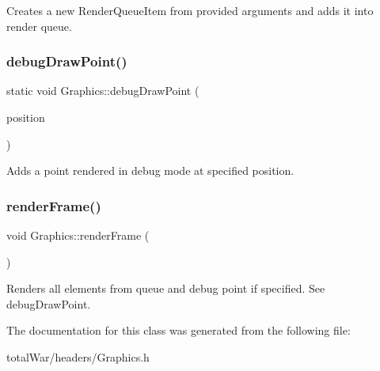 Creates a new Render\+Queue\+Item from provided arguments and adds it into render queue. \mbox{\label{class_graphics_ae33ea92e808a6e760032272b5d37ffcb}} 
\subsubsection{\texorpdfstring{debug\+Draw\+Point()}{debugDrawPoint()}}
{\footnotesize\ttfamily static void Graphics\+::debug\+Draw\+Point (\begin{DoxyParamCaption}\item[{const S\+D\+L\+\_\+\+Point}]{position }\end{DoxyParamCaption})\hspace{0.3cm}{\ttfamily [static]}}

Adds a point rendered in debug mode at specified position. \mbox{\label{class_graphics_a53721226d05dcf492faae8c222a744e0}} 
\subsubsection{\texorpdfstring{render\+Frame()}{renderFrame()}}
{\footnotesize\ttfamily void Graphics\+::render\+Frame (\begin{DoxyParamCaption}{ }\end{DoxyParamCaption})}

Renders all elements from queue and debug point if specified. See debug\+Draw\+Point. 

The documentation for this class was generated from the following file\+:\begin{DoxyCompactItemize}
\item 
total\+War/headers/Graphics.\+h\end{DoxyCompactItemize}
